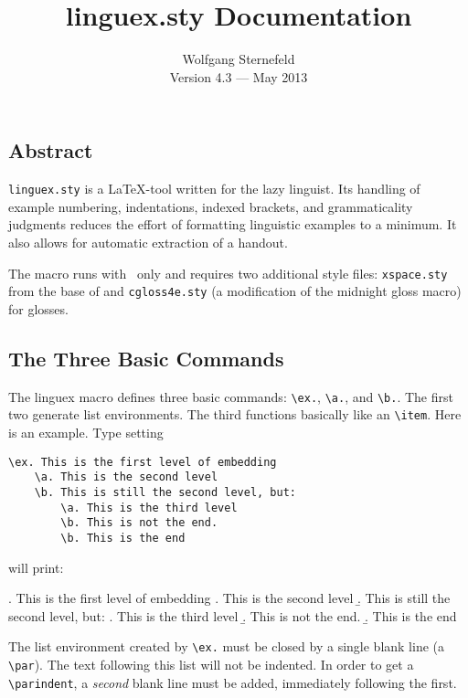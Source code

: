 \documentclass{article}
\begin{document}
           
\title{linguex.sty Documentation}
\author{Wolfgang Sternefeld\\
Version 4.3 --- May 2013}
\date{}
\maketitle

\subsection*{Abstract}%
{\tt linguex.sty} is a \LaTeX-tool written for the lazy linguist.  Its 
handling of example numbering, indentations, indexed brackets, and 
grammaticality judgments reduces the effort of formatting linguistic 
examples to a minimum.  It also allows for automatic extraction of a 
handout.

The macro runs with \LaTeXe\ only and requires two additional 
style files: {\tt xspace.sty} from 
the base of  and {\tt cgloss4e.sty} (a modification of the 
midnight gloss macro) for glosses.   

\subsection*{The Three Basic Commands} The linguex macro defines three 
basic commands: \verb-\ex.-, \verb-\a.-, and \verb-\b.-.  The first 
two generate list environments.  The third functions basically like an 
\verb-\item-.  Here is an example.  Type setting

\begin{verbatim} 
\ex. This is the first level of embedding
    \a. This is the second level
    \b. This is still the second level, but:
        \a. This is the third level
        \b. This is not the end.
        \b. This is the end
\end{verbatim}
will print:

\ex.  This is the first level of embedding
       \a.  This is the second level
       \b.  This is still the second level, but:
             \a. This is the third level
             \b. This is not the end.
             \b. This is the end 

The list environment created by \verb-\ex.- must be closed by a single 
blank line (a \verb-\par-).  The text following this list will not be 
indented.  In order to get a \verb|\parindent|, a \textit{second} 
blank line must be added, immediately following the first.
\end{document}
